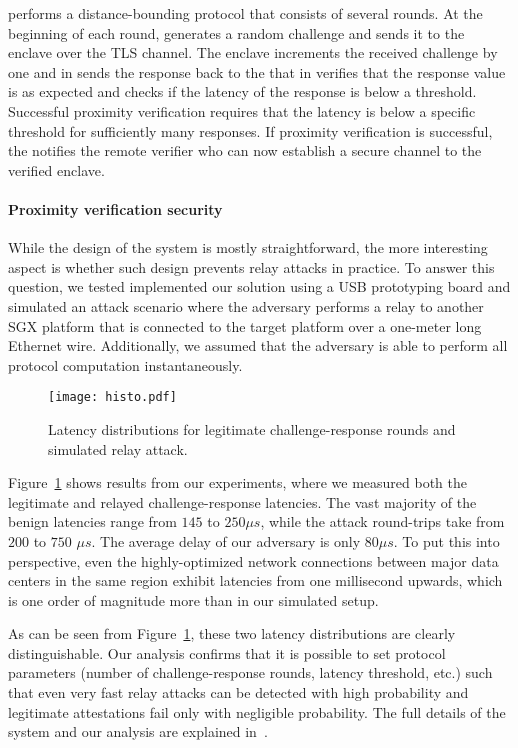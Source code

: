 \five \key performs a distance-bounding protocol that consists of several rounds. At the beginning of each round, \key generates a random challenge and sends it to the enclave over the TLS channel. \six The enclave increments the received challenge by one and in \seven sends the response back to the \key that in \eight verifies that the response value is as expected and checks if the latency of the response is below a threshold. Successful proximity verification requires that the latency is below a specific threshold for sufficiently many responses.
%
\nine  If proximity verification is successful, the \key notifies the remote verifier who can now establish a secure channel to the verified enclave.

\paragraph{Proximity verification security} While the design of the \proximitee system is mostly straightforward, the more interesting aspect is whether such design prevents relay attacks in practice. To answer this question, we tested implemented our solution using a USB prototyping board and simulated an attack scenario where the adversary performs a relay to another SGX platform that is connected to the target platform over a one-meter long Ethernet wire. Additionally, we assumed that the adversary is able to perform all protocol computation instantaneously. 

\begin{figure}[t]
  \centering
    \texttt{[image: histo.pdf]} 
    \caption{Latency distributions for legitimate challenge-response rounds and simulated relay attack.}
    \label{graph:histogram}
\end{figure}

Figure~\ref{graph:histogram} shows results from our experiments, where we measured both the legitimate and relayed challenge-response latencies. The vast majority of the benign latencies range from $145$ to $250 \mu s$, while the attack round-trips take from $200$ to $750$ $\mu s$. The average delay of our adversary is only $80 \mu s$. To put this into perspective, even the highly-optimized network connections between major data centers in the same region exhibit latencies from one millisecond upwards, which is one order of magnitude more than in our simulated setup. 

As can be seen from Figure~\ref{graph:histogram}, these two latency distributions are clearly distinguishable. Our analysis confirms that it is possible to set protocol parameters (number of challenge-response rounds, latency threshold, etc.) such that even very fast relay attacks can be detected with high probability and legitimate attestations fail only with negligible probability. The full details of the \proximitee system and our analysis are explained in~\cite{proximitee}.

